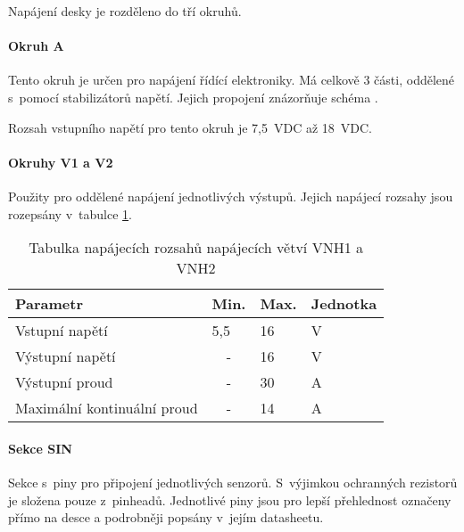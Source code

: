 Napájení desky je rozděleno do tří okruhů. 

\paragraph{Okruh A}
Tento okruh je určen pro napájení řídící elektroniky.
Má celkově 3 části, oddělené s~pomocí stabilizátorů napětí.
Jejich propojení znázorňuje schéma .

Rozsah vstupního napětí pro tento okruh je 7,5~VDC až 18~VDC.

\paragraph{Okruhy V1 a V2}
Použity pro oddělené napájení jednotlivých výstupů. 
Jejich napájecí rozsahy jsou rozepsány v~tabulce \ref{fig:powerSourceCharsVNH}.

\begin{table}[h]
    \centering
    \begin{tabular}{llll}
        \hline
        \multicolumn{1}{|l|}{\textbf{Parametr}}           & \multicolumn{1}{l|}{\textbf{Min.}} & \multicolumn{1}{l|}{\textbf{Max.}} & \multicolumn{1}{l|}{\textbf{Jednotka}} \\ \hline
        \multicolumn{1}{|l|}{Vstupní napětí}              & \multicolumn{1}{l|}{5,5}           & \multicolumn{1}{l|}{16}            & \multicolumn{1}{l|}{V}                 \\ \hline
        \multicolumn{1}{|l|}{Výstupní napětí}             & \multicolumn{1}{c|}{-}             & \multicolumn{1}{l|}{16}            & \multicolumn{1}{l|}{V}                 \\ \hline
        \multicolumn{1}{|l|}{Výstupní proud}              & \multicolumn{1}{c|}{-}             & \multicolumn{1}{l|}{30}            & \multicolumn{1}{l|}{A}                 \\ \hline
        \multicolumn{1}{|l|}{Maximální kontinuální proud} & \multicolumn{1}{c|}{-}             & \multicolumn{1}{l|}{14}            & \multicolumn{1}{l|}{A}                 \\ \hline
    \end{tabular}
    \caption{Tabulka napájecích rozsahů napájecích větví VNH1 a VNH2}
    \label{fig:powerSourceCharsVNH}
\end{table}

\paragraph{Sekce SIN}
Sekce s~piny pro připojení jednotlivých senzorů. 
S~výjimkou ochranných rezistorů je složena pouze z~pinheadů.
Jednotlivé piny jsou pro lepší přehlednost označeny přímo na desce a podrobněji popsány v~jejím datasheetu. 

